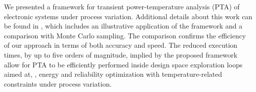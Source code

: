 We presented a framework for transient power-temperature analysis (PTA) of
electronic systems under process variation. Additional details about this work
can be found in \cite{ukhov2014}, which includes an illustrative application of
the framework and a comparison with Monte Carlo sampling. The comparison
confirms the efficiency of our approach in terms of both accuracy and speed. The
reduced execution times, by up to five orders of magnitude, implied by the
proposed framework allow for PTA to be efficiently performed inside design space
exploration loops aimed at, \eg, energy and reliability optimization with
temperature-related constraints under process variation.
